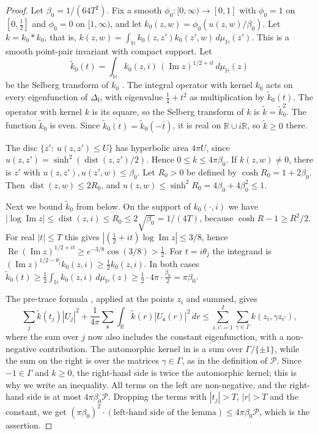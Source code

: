 \documentclass[11pt]{amsart}
\theoremstyle{remark}
\theoremstyle{definition}
\numberwithin{equation}{section}
\newcommand{\Pc}{\mathcal{P}}
\newcommand{\R}{\mathbb{R}}
\newcommand{\Hb}{\mathbb{H}}
\newcommand{\gs}{\mathfrak{s}}
\newcommand{\dmu}{d\mu_{\Hb}}
\begin{document}
\begin{proof}
Let $\beta_0=1/(64T^2)$. Fix a smooth $\phi_0:[0,\infty)\to[0,1]$ with $\phi_0=1$ on $[0,\frac12]$ and $\phi_0=0$ on $[1,\infty)$, and let $k_0(z,w)=\phi_0(u(z,w)/\beta_0)$. Let $k=k_0*k_0$, that is, $k(z,w)=\int_\Hb k_0(z,z')k_0(z',w)\,\dmu(z')$. This is a smooth point-pair invariant with compact support. Let
\[
\widetilde k_0(t)=\int_\Hb k_0(z,i)\,(\operatorname{Im}z)^{1/2+it}\,\dmu(z)
\]
be the Selberg transform of $k_0$ \cite[Ch.~1]{Iw}. The integral operator with kernel $k_0$ acts on every eigenfunction of $\Delta_\Hb$ with eigenvalue $\frac14+t^2$ as multiplication by $\widetilde k_0(t)$. The operator with kernel $k$ is its square, so the Selberg transform of $k$ is $\widetilde k=\widetilde k_0^2$. The function $\widetilde k_0$ is even. Since $\overline{\widetilde k_0(t)}=\widetilde k_0(-\bar t)$, it is real on $\R\cup i\R$, so $\widetilde k\ge0$ there.

The disc $\{z':\ u(z,z')\le U\}$ has hyperbolic area $4\pi U$, since $u(z,z')=\sinh^2(\operatorname{dist}(z,z')/2)$. Hence $0\le k\le4\pi\beta_0$. If $k(z,w)\ne0$, there is $z'$ with $u(z,z'),u(z',w)\le\beta_0$. Let $R_0>0$ be defined by $\cosh R_0=1+2\beta_0$. Then $\operatorname{dist}(z,w)\le2R_0$, and $u(z,w)\le\sinh^2R_0=4\beta_0+4\beta_0^2\le1$.

Next we bound $\widetilde k_0$ from below. On the support of $k_0(\cdot,i)$ we have $|\log\operatorname{Im}z|\le\operatorname{dist}(z,i)\le R_0\le2\sqrt{\beta_0}=1/(4T)$, because $\cosh R-1\ge R^2/2$. For real $|t|\le T$ this gives $|(\frac12+it)\log\operatorname{Im}z|\le3/8$, hence $\operatorname{Re}(\operatorname{Im}z)^{1/2+it}\ge e^{-3/8}\cos(3/8)>\frac12$. For $t=i\theta_j$ the integrand is $(\operatorname{Im}z)^{1/2-\theta_j}k_0(z,i)\ge\frac12k_0(z,i)$. In both cases $\widetilde k_0(t)\ge\frac12\int_\Hb k_0(z,i)\,\dmu(z)\ge\frac12\cdot4\pi\cdot\frac{\beta_0}2=\pi\beta_0$.

The pre-trace formula \cite[Theorem~7.4]{Iw}, applied at the points $z_i$ and summed, gives
\[
\sum_j\widetilde k(t_j)|U_j|^2+\frac1{4\pi}\sum_\gs\int_\R \widetilde k(r)|U_\gs(r)|^2\,dr\le\sum_{i,i'=1}^I\sum_{\gamma\in\Gamma}k(z_i,\gamma z_{i'}),
\]
where the sum over $j$ now also includes the constant eigenfunction, with a non-negative contribution. The automorphic kernel in \cite[Theorem~7.4]{Iw} is a sum over $\Gamma/\{\pm1\}$, while the sum on the right is over the matrices $\gamma\in\Gamma$, as in the definition of $\Pc$. Since $-1\in\Gamma$ and $k\ge0$, the right-hand side is twice the automorphic kernel; this is why we write an inequality. All terms on the left are non-negative, and the right-hand side is at most $4\pi\beta_0\Pc$. Dropping the terms with $|t_j|>T$, $|r|>T$ and the constant, we get $(\pi\beta_0)^2\cdot(\text{left-hand side of the lemma})\le4\pi\beta_0\Pc$, which is the assertion.
\end{proof}
\end{document}
